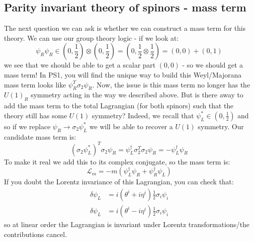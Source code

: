 \subsection{Parity invariant theory of spinors - mass term}
The next question we can ask is whether we can construct a mass term for this theory. We can use our group theory logic - if we look at:
\begin{equation}
    \psi_R \psi_R \in (0, \frac{1}{2}) \otimes (0, \frac{1}{2}) = (0, \frac{1}{2}\otimes \frac{1}{2}) = (0, 0) + (0, 1)
\end{equation}
we see that we should be able to get a scalar part $(0, 0)$ - so we should get a mass term! In PS1, you will find the unique way to build this Weyl/Majorana mass term looks like $\psi_R^T\sigma_2\psi_R$. Now, the issue is this mass term no longer has the $U(1)_R$ symmetry acting in the way we described above. But is there away to add the mass term to the total Lagrangian (for both spinors) such that the theory still has some $U(1)$ symmetry? Indeed, we recall that $\psi_L^* \in (0, \frac{1}{2})$ and so if we replace $\psi_R \to \sigma_2\psi_L^*$ we will be able to recover a $U(1)$ symmetry. Our candidate mass term is:
\begin{equation}
    (\sigma_2\psi_L^*)^T \sigma_2 \psi_R = \psi_L^\dag \sigma_2^T \sigma_2 \psi_R =-\psi_L^\dag \psi_R
\end{equation}
To make it real we add this to its complex conjugate, so the mass term is:
\begin{equation}
    \mathcal{L}_m = -m(\psi_L^\dag \psi_R + \psi_R^\dag\psi_L)
\end{equation}
If you doubt the Lorentz invariance of this Lagrangian, you can check that:
\begin{equation}
    \begin{split}
        \delta \psi_L &= i(\theta^i + i\eta^i)\frac{1}{2}\sigma_i\psi_i
        \\ \delta \psi_L &= i(\theta^i - i\eta^i)\frac{1}{2}\sigma_i\psi_i
    \end{split}
\end{equation}
so at linear order the Lagrangian is invariant under Lorentz transformations/the contributions cancel.

